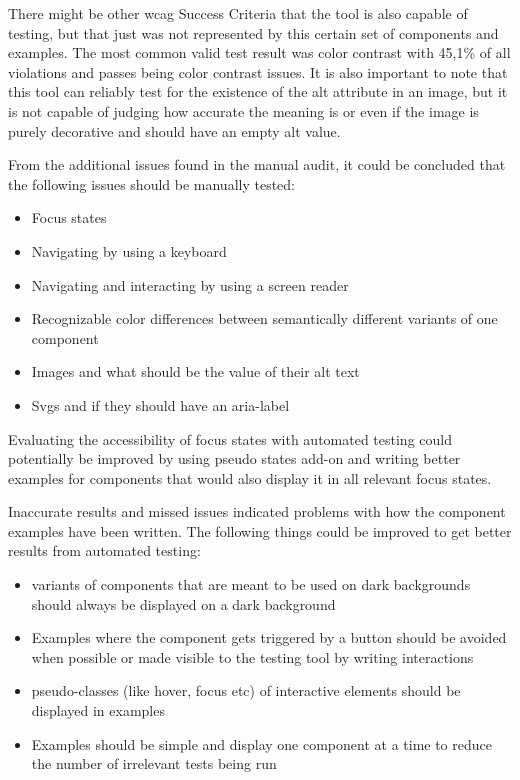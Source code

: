 \documentclass{master_thesis}
\begin{document}
There might be other \ac{wcag} Success Criteria that the tool is also capable of testing, but that just was not represented by this certain set of components and examples. The most common valid test result was color contrast with 45,1\% of all violations and passes being color contrast issues. It is also important to note that this tool can reliably test for the existence of the alt attribute in an image, but it is not capable of judging how accurate the meaning is or even if the image is purely decorative and should have an empty alt value.

From the additional issues found in the manual audit, it could be concluded that the following issues should be manually tested:
\begin{itemize}
	\item Focus states
	\item Navigating by using a keyboard
	\item Navigating and interacting by using a screen reader
	\item Recognizable color differences between semantically different variants of one component
	\item Images and what should be the value of their alt text
	\item Svgs and if they should have an aria-label
\end{itemize}

Evaluating the accessibility of focus states with automated testing could potentially be improved by using pseudo states add-on and writing better examples for components that would also display it in all relevant focus states.

Inaccurate results and missed issues indicated problems with how the component examples have been written. The following things could be improved to get better results from automated testing:
\begin{itemize}
	\item variants of components that are meant to be used on dark backgrounds should always be displayed on a dark background
	\item Examples where the component gets triggered by a button should be avoided when possible or made visible to the testing tool by writing interactions
	\item pseudo-classes (like hover, focus etc) of interactive elements should be displayed in examples
	\item Examples should be simple and display one component at a time to reduce the number of irrelevant tests being run
\end{itemize}
\end{document}
